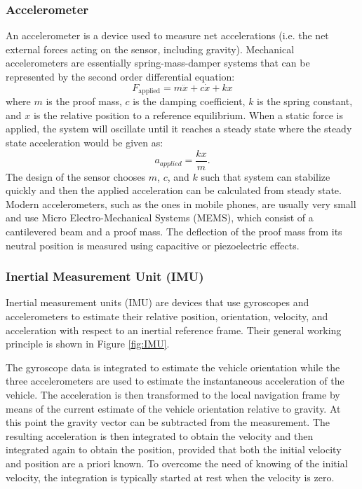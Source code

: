\subsubsection{Accelerometer}
An accelerometer is a device used to measure net accelerations (i.e. the net external forces acting on the sensor, including gravity). Mechanical accelerometers are essentially spring-mass-damper systems that can be represented by the second order differential equation\cite{DudekJenkin2008}:
\begin{equation*}
F_{\text{applied}} = m \ddot{x} + c \dot{x} + k x
\end{equation*}
where $m$ is the proof mass, $c$ is the damping coefficient, $k$ is the spring constant, and $x$ is the relative position to a reference equilibrium. When a static force is applied, the system will oscillate until it reaches a steady state where the steady state acceleration would be given as:
\begin{equation*}
    a_{applied} = \frac{kx}{m}.
\end{equation*}
The design of the sensor chooses $m$, $c$, and $k$ such that system can stabilize quickly and then the applied acceleration can be calculated from steady state.
Modern accelerometers, such as the ones in mobile phones, are usually very small and use Micro Electro-Mechanical Systems (MEMS), which consist of a cantilevered beam and a proof mass. The deflection of the proof mass from its neutral position is measured using capacitive or piezoelectric effects.


\subsubsection{Inertial Measurement Unit (IMU)}
Inertial measurement units (IMU) are devices that use gyroscopes and accelerometers to estimate their relative position, orientation, velocity, and acceleration with respect to an inertial reference frame. Their general working principle is shown in Figure \ref{fig:IMU}.

The gyroscope data is integrated to estimate the vehicle orientation while the three accelerometers are used to estimate the instantaneous acceleration of the vehicle. The acceleration is then transformed to the local navigation frame by means of the current estimate of the vehicle orientation relative to gravity. At this point the gravity vector can be subtracted from the measurement. The resulting acceleration is then integrated to obtain the velocity and then integrated again to obtain the position, provided that both the initial velocity and position are a priori known. 
To overcome the need of knowing of the initial velocity, the integration is typically started at rest when the velocity is zero.

